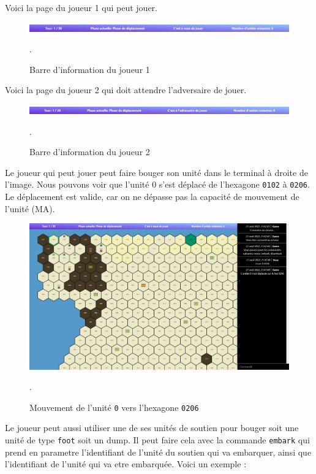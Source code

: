 Voici la page du joueur 1 qui peut jouer.\\
\begin{figure}[H]
    \centering
    \includegraphics[scale=0.6]{data/player_1_acces.jpg}
    \caption{Barre d'information du joueur 1}.
\end{figure}

Voici la page du joueur 2 qui doit attendre l'adversaire de jouer.\\
\begin{figure}[H]
    \centering
    \includegraphics[scale=0.6]{data/joueur_2.jpg}
    \caption{Barre d'information du joueur 2}.
\end{figure}

Le joueur qui peut jouer peut faire bouger son unité dans le terminal à droite de l'image.
Nous pouvons voir que l'unité 0 s'est déplacé de l'hexagone \lstinline{0102} à \lstinline{0206}. Le déplacement est valide, car on ne dépasse pas la capacité de mouvement de l'unité (MA).\\

\begin{figure}[H]
    \centering
    \includegraphics[scale=0.35]{data/move_unit_player_1.jpg}
    \caption{Mouvement de l'unité \lstinline{0} vers l'hexagone \lstinline{0206}}.
\end{figure}

Le joueur peut aussi utiliser une de ses unités de soutien pour bouger soit une unité de type {\tt foot} soit un dump.
Il peut faire cela avec la commande {\tt embark} qui prend en parametre l'identifiant de l'unité du soutien qui va embarquer, ainsi que l'identifiant de l'unité qui va etre embarquée. Voici un exemple :\\

